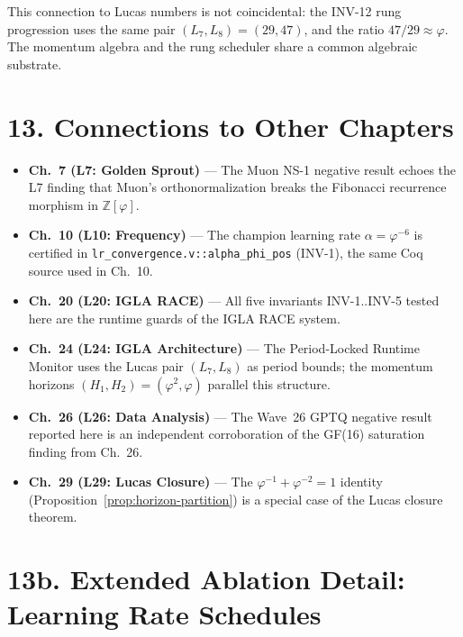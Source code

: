 This connection to Lucas numbers is not coincidental: the INV-12
rung progression uses the same pair \((L_7, L_8) = (29, 47)\),
and the ratio \(47/29 \approx \varphi\).  The momentum algebra and
the rung scheduler share a common algebraic substrate.

\section{13. Connections to Other Chapters}
\label{sec:28-connections}

\begin{itemize}
  \item \textbf{Ch.~7 (L7: Golden Sprout)} — The Muon NS-1 negative
        result echoes the L7 finding that Muon's orthonormalization
        breaks the Fibonacci recurrence morphism in \(\mathbb{Z}[\varphi]\).
  \item \textbf{Ch.~10 (L10: Frequency)} — The champion learning rate
        \(\alpha = \varphi^{-6}\) is certified in
        \texttt{lr\_convergence.v::alpha\_phi\_pos} (INV-1),
        the same Coq source used in Ch.~10.
  \item \textbf{Ch.~20 (L20: IGLA RACE)} — All five invariants
        INV-1..INV-5 tested here are the runtime guards of the IGLA
        RACE system.
  \item \textbf{Ch.~24 (L24: IGLA Architecture)} — The Period-Locked
        Runtime Monitor uses the Lucas pair \((L_7, L_8)\) as period
        bounds; the momentum horizons \((H_1, H_2) = (\varphi^2, \varphi)\)
        parallel this structure.
  \item \textbf{Ch.~26 (L26: Data Analysis)} — The Wave~26 GPTQ
        negative result reported here is an independent corroboration
        of the GF(16) saturation finding from Ch.~26.
  \item \textbf{Ch.~29 (L29: Lucas Closure)} — The
        \(\varphi^{-1} + \varphi^{-2} = 1\) identity
        (Proposition~\ref{prop:horizon-partition}) is a special case
        of the Lucas closure theorem.
\end{itemize}

\section{13b. Extended Ablation Detail: Learning Rate Schedules}
\label{sec:28-lr-schedules}

